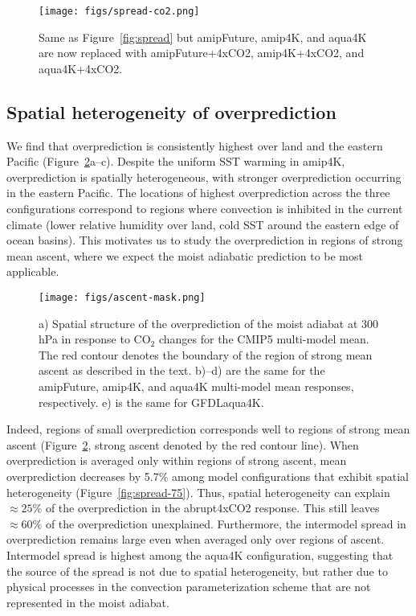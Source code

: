 \documentclass[draft]{agujournal2019}
\begin{document}
\begin{figure}
\centering
\texttt{[image: figs/spread-co2.png]}
\caption{Same as Figure~\ref{fig:spread} but amipFuture, amip4K, and aqua4K are now replaced with amipFuture+4xCO2, amip4K+4xCO2, and aqua4K+4xCO2.}
\label{fig:spread-co2}
\end{figure}

\subsection{Spatial heterogeneity of overprediction}
We find that overprediction is consistently highest over land and the eastern Pacific (Figure~\ref{fig:ascent-mask}a--c). Despite the uniform SST warming in amip4K, overprediction is spatially heterogeneous, with stronger overprediction occurring in the eastern Pacific. The locations of highest overprediction across the three configurations correspond to regions where convection is inhibited in the current climate (lower relative humidity over land, cold SST around the eastern edge of ocean basins). This motivates us to study the overprediction in regions of strong mean ascent, where we expect the moist adiabatic prediction to be most applicable.

\begin{figure}
\centering
\texttt{[image: figs/ascent-mask.png]}
\caption{a) Spatial structure of the overprediction of the moist adiabat at 300 hPa in response to CO$_2$ changes for the CMIP5 multi-model mean. The red contour denotes the boundary of the region of strong mean ascent as described in the text. b)--d) are the same for the amipFuture, amip4K, and aqua4K multi-model mean responses, respectively. e) is the same for GFDLaqua4K.}
\label{fig:ascent-mask}
\end{figure}

Indeed, regions of small overprediction corresponds well to regions of strong mean ascent (Figure~\ref{fig:ascent-mask}, strong ascent denoted by the red contour line). When overprediction is averaged only within regions of strong ascent, mean overprediction decreases by 5.7\% among model configurations that exhibit spatial heterogeneity (Figure~\ref{fig:spread-75}). Thus, spatial heterogeneity can explain $\approx25\%$ of the overprediction in the abrupt4xCO2 response. This still leaves $\approx60\%$ of the overprediction unexplained. Furthermore, the intermodel spread in overprediction remains large even when averaged only over regions of ascent. Intermodel spread is highest among the aqua4K configuration, suggesting that the source of the spread is not due to spatial heterogeneity, but rather due to physical processes in the convection parameterization scheme that are not represented in the moist adiabat.
\end{document}
